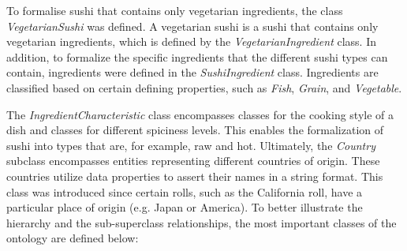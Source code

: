 \documentclass[a4paper]{article}
\theoremstyle{plain}
\theoremstyle{definition}
\begin{document}
    To formalise sushi that contains only vegetarian ingredients, the class \textit{VegetarianSushi} was defined. A vegetarian sushi is a sushi that contains only vegetarian ingredients, which is defined by the \textit{VegetarianIngredient} class. In addition, to formalize the specific ingredients that the different sushi types can contain, ingredients were defined in the \textit{SushiIngredient} class. Ingredients are classified based on certain defining properties, such as \textit{Fish}, \textit{Grain}, and \textit{Vegetable}.

    The \textit{IngredientCharacteristic} class encompasses classes for the cooking style of a dish and classes for different spiciness levels. This enables the formalization of sushi into types that are, for example, raw and hot. Ultimately, the \textit{Country} subclass encompasses entities representing different countries of origin. These countries utilize data properties to assert their names in a string format. This class was introduced since certain rolls, such as the California roll, have a particular place of origin (e.g. Japan or America). To better illustrate the hierarchy and the sub-superclass relationships, the most important classes of the ontology are defined below:
    \newline
    \newline
\end{document}
